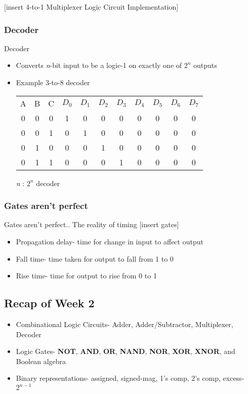 \documentclass{article}
\begin{document}
[insert 4-to-1 Multiplexer Logic Circuit Implementation]

\subsubsection{Decoder}

Decoder
\begin{itemize}
\item Converts \textit{n}-bit input to be a logic-1 on exactly one of $2^{n}$ outputs
\item Example 3-to-8 decoder \\
\begin{tabular}{ c c c | c c c c c c c c }
A & B & C & $D_{0}$ & $D_{1}$ & $D_{2}$ & $D_{3}$ & $D_{4}$ & $D_{5}$ & $D_{6}$ & $D_{7}$ \\
0 & 0 & 0 & 1 & 0 & 0 & 0 & 0 & 0 & 0 & 0 \\
0 & 0 & 1 & 0 & 1 & 0 & 0 & 0 & 0 & 0 & 0 \\
0 & 1 & 0 & 0 & 0 & 1 & 0 & 0 & 0 & 0 & 0 \\
0 & 1 & 1 & 0 & 0 & 0 & 1 & 0 & 0 & 0 & 0 \\
\end{tabular}
\textit{n} : $2^{n}$ decoder
\end{itemize}

\subsubsection{Gates aren't perfect}
Gates aren't perfect.. The reality of timing
[insert gates]
\begin{itemize}
\item Propagation delay- time for change in input to affect output
\item Fall time- time taken for output to fall from 1 to 0
\item Rise time- time for output to rise from 0 to 1
\end{itemize}

\subsection{Recap of Week 2}
\begin{itemize}
\item Combinational Logic Circuits- Adder, Adder/Subtractor, Multiplexer, Decoder
\item Logic Gates- \textbf{NOT}, \textbf{AND}, \textbf{OR}, \textbf{NAND}, \textbf{NOR}, \textbf{XOR}, \textbf{XNOR},
and Boolean algebra
\item Binary representations- assigned, signed-mag, 1's comp, 2's comp, excess-$2^{n-1}$
\end{itemize}
\end{document}
